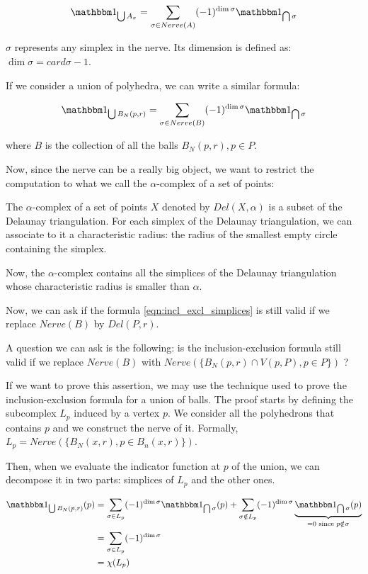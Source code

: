 $$ \indicator{\bigcup A_x} = \sum_{\sigma \in Nerve(A)} (-1)^{\dim \sigma}
\indicator{\bigcap \sigma} $$

$ \sigma $ represents any simplex in the nerve. Its dimension is defined as: $
\dim \sigma = card \sigma - 1 $.

If we consider a union of polyhedra, we can write a similar formula:

\begin{equation}
    \indicator{\bigcup B_N(p, r)} = \sum_{\sigma \in Nerve(B)} (-1)^{\dim \sigma}
    \indicator{\bigcap \sigma}
    \label{eqn:incl_excl_simplices}
\end{equation}

where $ B $ is the collection of all the balls $ B_N(p, r), p \in P $.

Now, since the nerve can be a really big object, we want to restrict the
computation to what we call the $\alpha$-complex of a set of points:

\begin{definition} The $\alpha$-complex of a set of points $ X $ denoted by $
    Del(X, \alpha) $ is a subset of the Delaunay triangulation. For each simplex
    of the Delaunay triangulation, we can associate to it a characteristic
    radius: the radius of the smallest empty circle containing the simplex.

    Now, the $\alpha$-complex contains all the simplices of the Delaunay
    triangulation whose characteristic radius is smaller than $\alpha$.
\end{definition}

Now, we can ask if the formula \ref{eqn:incl_excl_simplices} is still valid if
we replace $ Nerve(B) $ by $ Del(P, r) $.

A question we can ask is the following: is the inclusion-exclusion formula still
valid if we replace $ Nerve(B) $ with $ Nerve(\{ B_N(p, r) \cap V(p, P), p \in
P\}) $ ?

If we want to prove this assertion, we may use the technique used to prove the
inclusion-exclusion formula for a union of balls. The proof starts by defining
the subcomplex $ L_p $ induced by a vertex $ p $.  We consider all the
polyhedrons that contains $ p $ and we construct the nerve of it. Formally, $
L_p = Nerve(\{ B_N(x, r), p \in B_n(x, r)\}) $.

Then, when we evaluate the indicator function at $ p $ of the union, we can
decompose it in two parts: simplices of $ L_p $ and the other ones.

\begin{align*}
    \indicator{\bigcup B_N(p, r)}(p) &= \sum_{\sigma \in L_p} (-1)^{\dim \sigma}
    \indicator{\bigcap \sigma}(p) + \sum_{\sigma \notin L_p} (-1)^{\dim \sigma}
    \underbrace{\indicator{\bigcap \sigma}(p)}_{= 0 \text{ since } p \notin
        \sigma} \\
    &= \sum_{\sigma \in L_p} (-1)^{\dim \sigma} \\
    &= \chi(L_p)
\end{align*}

